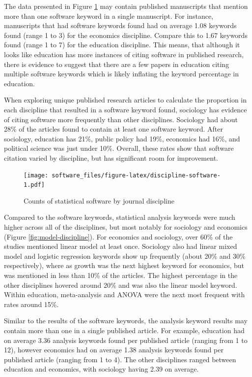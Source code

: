 \documentclass[
  english,
  ,man]{apa6}
\begin{document}
The data presented in Figure \ref{fig:discipline-software} may contain published manuscripts that mention more than one software keyword in a single manuscript. For instance, manuscripts that had software keywords found had on average 1.08 keywords found (range 1 to 3) for the economics discipline. Compare this to 1.67 keywords found (range 1 to 7) for the education discipline. This means, that although it looks like education has more instances of citing software in published research, there is evidence to suggest that there are a few papers in education citing multiple software keywords which is likely inflating the keyword percentage in education.

When exploring unique published research articles to calculate the proportion in each discipline that resulted in a software keyword found, sociology has evidence of citing software more frequently than other disciplines. Sociology had about 28\% of the articles found to contain at least one software keyword. After sociology, education has 21\%, public policy had 19\%, economics had 16\%, and political science was just under 10\%. Overall, these rates show that software citation varied by discipline, but has significant room for improvement.

\begin{figure}
\centering
\texttt{[image: software\_files/figure-latex/discipline-software-1.pdf]}
\caption{\label{fig:discipline-software}Counts of statistical software by journal discipline}
\end{figure}

Compared to the software keywords, statistical analysis keywords were much higher across all of the disciplines, but most notably for sociology and economics (Figure \ref{fig:model-discipline}). For economics and sociology, over 60\% of the studies mentioned linear model at least once. Sociology also had linear mixed model and logistic regression keywords show up frequently (about 20\% and 30\% respectively), where as growth was the next highest keyword for economics, but was mentioned in less than 10\% of the articles. The highest percentage in the other disciplines hovered around 20\% and was also the linear model keyword. Within education, meta-analysis and ANOVA were the next most frequent with rates around 15\%.

Similar to the results of the software keywords, the analysis keyword results may contain more than one in a single published article. For example, education had on average 3.36 analysis keywords found per published article (ranging from 1 to 12), however economics had on average 1.38 analysis keywords found per published article (ranging from 1 to 4). The other disciplines ranged between education and economics, with sociology having 2.39 on average.
\end{document}
